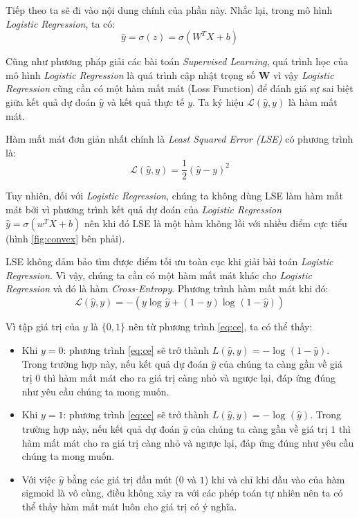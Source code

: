 Tiếp theo ta sẽ đi vào nội dung chính của phần này. Nhắc lại, trong mô hình \textit{Logistic Regression}, ta có:
\begin{equation*}
    \hat{y}= \sigma(z) = \sigma(W^TX + b)
\end{equation*}

Cũng như phương pháp giải các bài toán \textit{Supervised Learning}, quá trình học của mô hình \textit{Logistic Regression} là quá trình cập nhật trọng số $\mathbf{W}$ vì vậy \textit{Logistic Regression} cũng cần có một hàm mất mát (Loss Function) để đánh giá sự sai biệt giữa kết quả dự đoán $\hat{y}$ và kết quả thực tế $y$. Ta ký hiệu $\mathcal{L}(\hat{y}, y)$ là hàm mất mát.

Hàm mất mát đơn giản nhất chính là \textit{Least Squared Error (LSE)} có phương trình là:
\begin{equation*}
    \mathcal{L}(\hat{y}, y) = \frac{1}{2}(\hat{y} - y)^2
\end{equation*}

Tuy nhiên, đối với \textit{Logistic Regression}, chúng ta không dùng LSE làm hàm mất mát bởi vì phương trình kết quả dự đoán của \textit{Logistic Regression} $\hat{y} = \sigma(w^TX + b)$ nên khi đó LSE là một hàm không lồi với nhiều điểm cực tiểu (hình \ref{fig:convex} bên phải).

LSE không đảm bảo tìm được điểm tối ưu toàn cục khi giải bài toán \textit{Logistic Regression}. Vì vậy, chúng ta cần có một hàm mất mát khác cho \textit{Logistic Regression} và đó là hàm \textit{Cross-Entropy}. Phương trình hàm mất mát khi đó:
\begin{equation} \label{eq:ce}
    \mathcal{L}(\hat{y}, y) = -(y\log_{}{\hat{y}} + (1 - y)\log_{}{(1 - \hat{y})})
\end{equation}

Vì tập giá trị của $y$ là $\{0,1\}$ nên từ phương trình \eqref{eq:ce}, ta có thể thấy:
\begin{itemize}
    \item Khi $y = 0$: phương trình \eqref{eq:ce} sẽ trở thành $L(\hat{y}, y) = -\log_{}{(1 - \hat{y})}$. Trong trường hợp này, nếu kết quả dự đoán $\hat{y}$ của chúng ta càng gần về giá trị $0$ thì hàm mất mát cho ra giá trị càng nhỏ và ngược lại, đáp ứng đúng như yêu cầu chúng ta mong muốn.
    \item  Khi $y = 1$: phương trình \eqref{eq:ce} sẽ trở thành $L(\hat{y}, y) = -\log_{}{(\hat{y})}$. Trong trường hợp này, nếu kết quả dự đoán $\hat{y}$ của chúng ta càng gần về giá trị $1$ thì hàm mất mát cho ra giá trị càng nhỏ và ngược lại, đáp ứng đúng như yêu cầu chúng ta mong muốn.
    \item Với việc $\hat{y}$ bằng các giá trị đầu mút ($0$ và $1$) khi và chỉ khi đầu vào của hàm sigmoid là vô cùng, điều không xảy ra với các phép toán tự nhiên nên ta có thể thấy hàm mất mát luôn cho giá trị có ý nghĩa.
\end{itemize}

